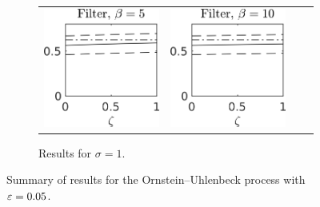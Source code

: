 \documentclass[10pt]{article}
\begin{document}
\begin{figure}[t]
\begin{subfigure}{\linewidth}
\begin{tabular}{cccc}
			\includegraphics[]{Figures/A_filt_s10_b5.png} & \includegraphics[]{Figures/A_filt_s10_b10.png}
		\end{tabular}	
		\caption{Results for $\sigma = 1$.}
	\end{subfigure}
	\caption{Summary of results for the Ornstein--Uhlenbeck process with $\varepsilon=0.05$.}
	\label{fig:Result_OU}
\end{figure}
\end{document}
